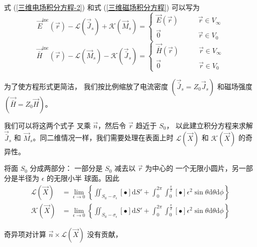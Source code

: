 \par 式 (\ref{三维电场积分方程-2}) 和式 (\ref{三维磁场积分方程}) 可以写为
\begin{equation}
    \vec{E}^{\text{inc}}(\vec{r})-\mathcal{L}(\vec{\bar{J}}_s)
    +\mathcal{K}(\vec{M}_s)=
    \left\{
        \begin{aligned}
            \vec{E}(\vec{r}) \qquad &\vec{r} \in V_{\infty} \\
            \vec{0} \ \ \ \qquad &\vec{r} \in V_{0}
        \end{aligned}
    \right.
    \label{表面电场积分方程}
\end{equation}
\begin{equation}
    \vec{\bar{H}}^{\text{inc}}(\vec{r})-\mathcal{L}(\vec{M}_s)
    -\mathcal{K}(\vec{\bar{J}}_s)=
    \left\{
        \begin{aligned}
            \vec{\bar{H}}(\vec{r}) \qquad &\vec{r} \in V_{\infty} \\
            \vec{0} \ \ \ \qquad &\vec{r} \in V_{0}
        \end{aligned}
    \right.
    \label{表面磁场积分方程}
\end{equation}
\par 为了使方程形式更简洁，
我们按比例缩放了电流密度 $(\vec{\bar{J}}_s=Z_0\vec{J}_s)$ 
和磁场强度 $(\vec{\bar{H}}=Z_0\vec{H})$。
\par 我们可以将这两个式子
叉乘 $\vec{n}$，然后令 $\vec{r}$ 趋近于 $S_0$，
以此建立积分方程来求解 $\vec{\bar{J}}_s$ 和
$\vec{M}_s$。同二维情况一样，我们需要处理在表面上时
$\mathcal{L}(\vec{X})$ 和 $\mathcal{K}(\vec{X})$ 的奇异性。
\par 将面 $S_0$ 分成两部分：
一部分是 $S_0$ 减去以 $\vec{r}$ 为中心的
一个无限小圆片，另一部分是半径为 $\epsilon$ 的无限小半
球面。因此
\begin{align}
    \mathcal{L}(\vec{X})
    &=\lim_{\epsilon\rightarrow 0}
    \left\{
        \iint_{S_0-\sigma_{\epsilon}}
        [\bullet]\text{d}S'
        +\int_{0}^{2\pi}
        \int_{0}^{\frac{\pi}{2}}
        [\bullet]\epsilon^2 \sin\theta \text{d}\theta\text{d}\phi
    \right\}\\
    \mathcal{K}(\vec{X})
    &=\lim_{\epsilon\rightarrow 0}
    \left\{
        \iint_{S_0-\sigma_{\epsilon}}
        [\bullet]\text{d}S'
        +\int_{0}^{2\pi}
        \int_{0}^{\frac{\pi}{2}}
        [\bullet]\epsilon^2 \sin\theta \text{d}\theta\text{d}\phi
    \right\}
\end{align}
\par 奇异项对计算 $\vec{n}\times \mathcal{L}(\vec{X})$ 没有贡献，
